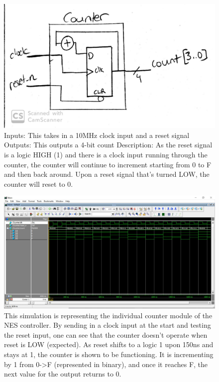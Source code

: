 \documentclass[a4paper]{article}
\begin{document}
\begin{figure}[H]
  \centering
    \includegraphics[width=.85\textwidth]{images/block_diagrams/nes/counter5.jpg}
	\caption{Inputs: This takes in a 10MHz clock input and a reset signal \newline
Outputs: This outputs a 4-bit count \newline
Description: As the reset signal is a logic HIGH (1) and there is a clock input running through the counter, the counter will continue to increment starting from 0 to F and then back around. Upon a reset signal that’s turned LOW, the counter will reset to 0.}
    \label{fig:counter}
\end{figure}

\begin{figure}[H]
  \centering
    \includegraphics[width=.85\textwidth]{images/ModelSim/nescounter.JPG}
	\caption{This simulation is representing the individual counter module of the NES controller. By sending in a clock input at the start and testing the reset input, one can see that the counter doesn’t operate when reset is LOW (expected). As reset shifts to a logic 1 upon 150ns and stays at 1, the counter is shown to be functioning. It is incrementing by 1 from 0->F (represented in binary), and once it reaches F, the next value for the output returns to 0.}
    \label{fig:counter_sim}
\end{figure}
\end{document}
